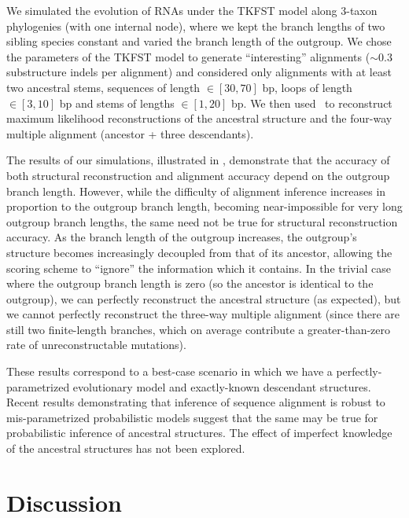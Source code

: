 \documentclass[10pt]{article}
\begin{document}
We simulated the evolution of RNAs under the TKFST model along
3-taxon phylogenies (with one internal node), where we kept the branch lengths of two
sibling species constant and varied the branch length of the
outgroup.  We chose the parameters of the TKFST model to
generate ``interesting'' alignments ($\sim 0.3$ substructure indels per
alignment) and considered only alignments with at least two ancestral
stems, sequences of length $\in [30, 70]$ bp, loops of length $\in [3,
10]$ bp and stems of lengths $\in [1, 20]$ bp.
We then used \indiegram\ to reconstruct maximum likelihood reconstructions of the ancestral structure and the four-way multiple alignment (ancestor + three descendants).

The results of our simulations, illustrated in ,
demonstrate that the accuracy of both structural
reconstruction and alignment accuracy depend on the outgroup
branch length.  However, while the difficulty of alignment inference
increases in proportion to the outgroup branch length, becoming
near-impossible for very long outgroup branch lengths, the same need
not be true for structural reconstruction accuracy.  As the branch
length of the outgroup increases, the outgroup's structure becomes increasingly decoupled from
that of its ancestor, allowing the scoring scheme to ``ignore'' the
information which it contains.
In the trivial case where the outgroup branch length is zero (so the ancestor is identical to the outgroup),
we can perfectly reconstruct the ancestral structure (as expected),
but we cannot perfectly reconstruct the three-way multiple alignment
 (since there are still two finite-length branches,
 which on average contribute a greater-than-zero rate of unreconstructable mutations).

These results correspond to a best-case scenario in which we
have a perfectly-parametrized evolutionary model and exactly-known descendant structures.
Recent results
demonstrating that inference of sequence alignment is
robust to mis-parametrized probabilistic models \cite{Lunter2007}
suggest that the same may be true for probabilistic inference of
ancestral structures.
The effect of imperfect knowledge of the ancestral structures has not been explored.

\newpage
\section*{Discussion}
\end{document}
